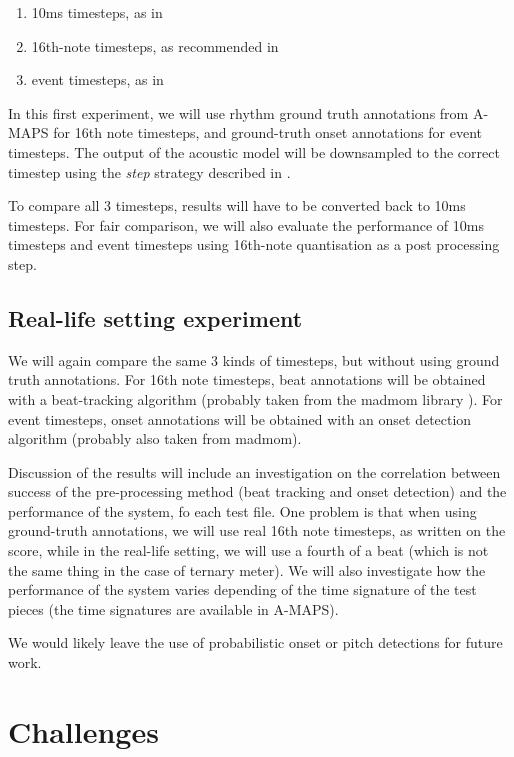 \documentclass{article}
\begin{document}
\begin{enumerate}
\item 10ms timesteps, as in \cite{sigtia2016end}
\item 16th-note timesteps, as recommended in \cite{Ycart2017}
\item event timesteps, as in \cite{app8030470}
\end{enumerate}

In this first experiment, we will use rhythm ground truth annotations from A-MAPS for 16th note timesteps, and ground-truth onset annotations for event timesteps.
The output of the acoustic model will be downsampled to the correct timestep using the \emph{step}
strategy described in \cite{ycart2018polyphonic}.

To compare all 3 timesteps, results will have to be converted back to 10ms timesteps.
For fair comparison, we will also evaluate the performance of 10ms timesteps and event timesteps using 16th-note quantisation as a post processing step.

\subsection{Real-life setting experiment}

We will again compare the same 3 kinds of timesteps, but without using ground truth annotations.
For 16th note timesteps, beat annotations will be obtained with a beat-tracking algorithm (probably taken from the madmom library \cite{madmom}).
For event timesteps, onset annotations will be obtained with an onset detection algorithm (probably also taken from madmom).

Discussion of the results will include an investigation on the correlation between success of the pre-processing method (beat tracking and onset detection) and the performance of the system, fo each test file.
One problem is that when using ground-truth annotations, we will use real 16th note timesteps, as written on the score, while in the real-life setting, we will use a fourth of a beat (which is not the same thing in the case of ternary meter).
We will also investigate how the performance of the system varies depending of the time signature of the test pieces (the time signatures are available in A-MAPS).

We would likely leave the use of probabilistic onset or pitch detections for future work.


\section{Challenges}
\end{document}
